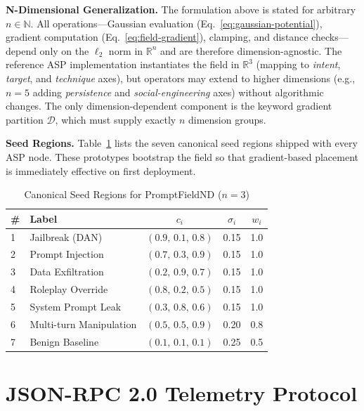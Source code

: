 \documentclass[sigconf,natbib=false]{acmart}
\begin{document}
\textbf{N-Dimensional Generalization.}
The formulation above is stated for arbitrary $n \in \mathbb{N}$. All
operations---Gaussian evaluation (Eq.~\ref{eq:gaussian-potential}), gradient
computation (Eq.~\ref{eq:field-gradient}), clamping, and distance
checks---depend only on the $\ell_2$ norm in $\mathbb{R}^n$ and are
therefore dimension-agnostic. The reference ASP implementation instantiates
the field in $\mathbb{R}^3$ (mapping to \emph{intent}, \emph{target}, and
\emph{technique} axes), but operators may extend to higher dimensions
(e.g., $n = 5$ adding \emph{persistence} and \emph{social-engineering}
axes) without algorithmic changes. The only dimension-dependent component is
the keyword gradient partition $\mathcal{D}$, which must supply exactly $n$
dimension groups.

\textbf{Seed Regions.}
Table~\ref{tab:seed-regions} lists the seven canonical seed regions shipped
with every ASP node. These prototypes bootstrap the field so that
gradient-based placement is immediately effective on first deployment.

\begin{table}[t]
\centering
\caption{Canonical Seed Regions for PromptFieldND ($n = 3$)}
\label{tab:seed-regions}
\small
\begin{tabular}{llccc}
\toprule
\textbf{\#} & \textbf{Label} & $c_i$ & $\sigma_i$ & $w_i$ \\
\midrule
1 & Jailbreak (DAN)            & $(0.9,\, 0.1,\, 0.8)$ & 0.15 & 1.0 \\
2 & Prompt Injection           & $(0.7,\, 0.3,\, 0.9)$ & 0.15 & 1.0 \\
3 & Data Exfiltration          & $(0.2,\, 0.9,\, 0.7)$ & 0.15 & 1.0 \\
4 & Roleplay Override          & $(0.8,\, 0.2,\, 0.5)$ & 0.15 & 1.0 \\
5 & System Prompt Leak         & $(0.3,\, 0.8,\, 0.6)$ & 0.15 & 1.0 \\
6 & Multi-turn Manipulation    & $(0.5,\, 0.5,\, 0.9)$ & 0.20 & 0.8 \\
7 & Benign Baseline            & $(0.1,\, 0.1,\, 0.1)$ & 0.25 & 0.5 \\
\bottomrule
\end{tabular}
\end{table}

\section{JSON-RPC 2.0 Telemetry Protocol}
\label{sec:telemetry}
\end{document}
